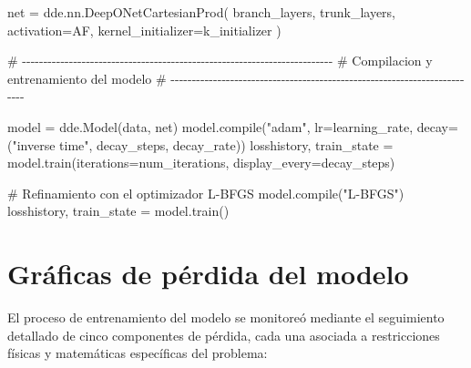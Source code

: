 \documentclass[
  spanish,
  us-letterpaper,
]{scrreprt}
\newenvironment{Shaded}{\begin{snugshade}}{\end{snugshade}}
\newcommand{\BuiltInTok}[1]{\textcolor[rgb]{0.00,0.23,0.31}{#1}}
\newcommand{\CommentTok}[1]{\textcolor[rgb]{0.37,0.37,0.37}{#1}}
\newcommand{\NormalTok}[1]{\textcolor[rgb]{0.00,0.23,0.31}{#1}}
\newcommand{\OperatorTok}[1]{\textcolor[rgb]{0.37,0.37,0.37}{#1}}
\newcommand{\StringTok}[1]{\textcolor[rgb]{0.13,0.47,0.30}{#1}}
\theoremstyle{definition}
\theoremstyle{plain}
\theoremstyle{remark}
\begin{document}
\begin{Shaded}
\begin{Highlighting}[]
\NormalTok{net }\OperatorTok{=}\NormalTok{ dde.nn.DeepONetCartesianProd(}
\NormalTok{    branch\_layers,}
\NormalTok{    trunk\_layers,}
\NormalTok{    activation}\OperatorTok{=}\NormalTok{AF,}
\NormalTok{    kernel\_initializer}\OperatorTok{=}\NormalTok{k\_initializer}
\NormalTok{)}

\CommentTok{\# {-}{-}{-}{-}{-}{-}{-}{-}{-}{-}{-}{-}{-}{-}{-}{-}{-}{-}{-}{-}{-}{-}{-}{-}{-}{-}{-}{-}{-}{-}{-}{-}{-}{-}{-}{-}{-}{-}{-}{-}{-}{-}{-}{-}{-}{-}{-}{-}{-}{-}{-}{-}{-}{-}{-}{-}{-}{-}{-}{-}{-}{-}{-}{-}{-}{-}{-}{-}{-}{-}{-}{-}{-}}
\CommentTok{\# Compilacion y entrenamiento del modelo}
\CommentTok{\# {-}{-}{-}{-}{-}{-}{-}{-}{-}{-}{-}{-}{-}{-}{-}{-}{-}{-}{-}{-}{-}{-}{-}{-}{-}{-}{-}{-}{-}{-}{-}{-}{-}{-}{-}{-}{-}{-}{-}{-}{-}{-}{-}{-}{-}{-}{-}{-}{-}{-}{-}{-}{-}{-}{-}{-}{-}{-}{-}{-}{-}{-}{-}{-}{-}{-}{-}{-}{-}{-}{-}{-}{-}}

\NormalTok{model }\OperatorTok{=}\NormalTok{ dde.Model(data, net)}
\NormalTok{model.}\BuiltInTok{compile}\NormalTok{(}\StringTok{"adam"}\NormalTok{, lr}\OperatorTok{=}\NormalTok{learning\_rate,}
\NormalTok{            decay}\OperatorTok{=}\NormalTok{(}\StringTok{"inverse time"}\NormalTok{, decay\_steps, decay\_rate))}
\NormalTok{losshistory, train\_state }\OperatorTok{=}\NormalTok{ model.train(iterations}\OperatorTok{=}\NormalTok{num\_iterations,}
\NormalTok{display\_every}\OperatorTok{=}\NormalTok{decay\_steps)}

\CommentTok{\# Refinamiento con el optimizador L{-}BFGS}
\NormalTok{model.}\BuiltInTok{compile}\NormalTok{(}\StringTok{"L{-}BFGS"}\NormalTok{)}
\NormalTok{losshistory, train\_state }\OperatorTok{=}\NormalTok{ model.train()}
\end{Highlighting}
\end{Shaded}

\section{Gráficas de pérdida del
modelo}\label{gruxe1ficas-de-puxe9rdida-del-modelo}

El proceso de entrenamiento del modelo se monitoreó mediante el
seguimiento detallado de cinco componentes de pérdida, cada una asociada
a restricciones físicas y matemáticas específicas del problema:
\end{document}
